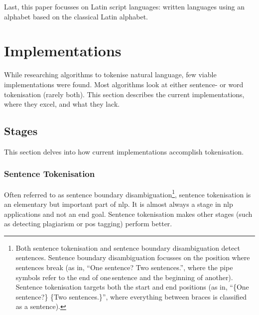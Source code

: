 Last, this paper focusses on Latin script languages: written languages
  using an alphabet based on the classical Latin alphabet.

\section{Implementations}\label{implementations}

While researching algorithms to tokenise natural language, few viable
  implementations were found.
Most algorithms look at either sentence- or word tokenisation (rarely both).
This section describes the current implementations, where they excel, and
  what they lack.

\subsection{Stages}\label{stages}

This section delves into how current implementations accomplish tokenisation.

\subsubsection{Sentence Tokenisation}\label{sentence-tokenisation}

Often referred to as sentence boundary disambiguation\footnote{Both
    sentence tokenisation and sentence boundary disambiguation detect
      sentences.
    Sentence boundary disambiguation focusses on the position where
      sentences break (as in, ``One sentence?\textbar{} Two
      sentences.\textbar{}'', where the pipe symbols refer to the end of
      one\,sentence and the beginning of another).
    Sentence tokenisation targets both the start and end positions (as in,
      ``\{One sentence?\} \{Two sentences.\}'', where everything between
      braces is classified as a sentence).}, sentence
  tokenisation is an elementary but important part of \gls{nlp}.
It is almost always a stage in \gls{nlp} applications and not an end goal.
Sentence tokenisation makes other stages (such as detecting plagiarism or
  \gls{pos} tagging) perform better.

